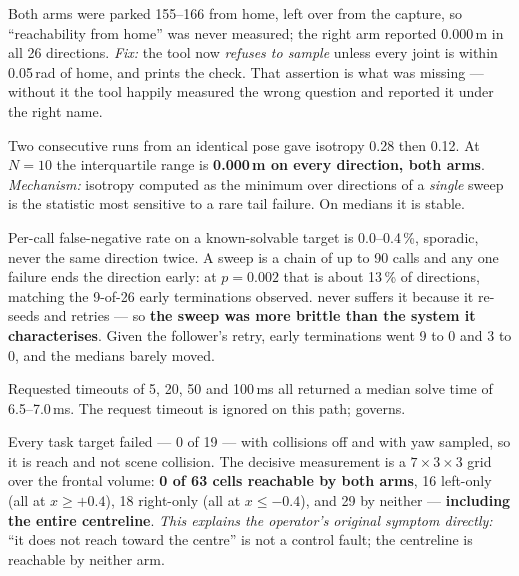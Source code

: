 {Both arms were parked 155--166\dg{} from home, left over from the capture, so
``reachability from home'' was never measured; the right arm reported 0.000\,m
in all 26 directions. \textit{Fix:} the tool now \emph{refuses to sample} unless
every joint is within 0.05\,rad of home, and prints the check. That assertion is
what was missing --- without it the tool happily measured the wrong question and
reported it under the right name.}

{Two consecutive runs from an identical pose gave isotropy 0.28 then 0.12. At
$N=10$ the interquartile range is \textbf{0.000\,m on every direction, both
arms}. \textit{Mechanism:} isotropy computed as the minimum over directions of a
\emph{single} sweep is the statistic most sensitive to a rare tail failure. On
medians it is stable.}

{Per-call false-negative rate on a known-solvable target is 0.0--0.4\,\%,
sporadic, never the same direction twice. A sweep is a chain of up to 90 calls
and any one failure ends the direction early: at $p=0.002$ that is about 13\,\%
of directions, matching the 9-of-26 early terminations observed.
 never suffers it because it re-seeds and retries ---
so \textbf{the sweep was more brittle than the system it characterises}. Given
the follower's retry, early terminations went 9 to 0 and 3 to 0, and the medians
barely moved.}

{Requested timeouts of 5, 20, 50 and 100\,ms all returned a median solve time of
6.5--7.0\,ms. The request timeout is ignored on this path;
 governs.}


{Every task target failed --- 0 of 19 --- with collisions off and with yaw
sampled, so it is reach and not scene collision. The decisive measurement is a
$7\times3\times3$ grid over the frontal volume: \textbf{0 of 63 cells reachable
by both arms}, 16 left-only (all at $x \ge +0.4$), 18 right-only (all at
$x \le -0.4$), and 29 by neither --- \textbf{including the entire centreline}.
\textit{This explains the operator's original symptom directly:} ``it does not
reach toward the centre'' is not a control fault; the centreline is reachable
by neither arm.}

